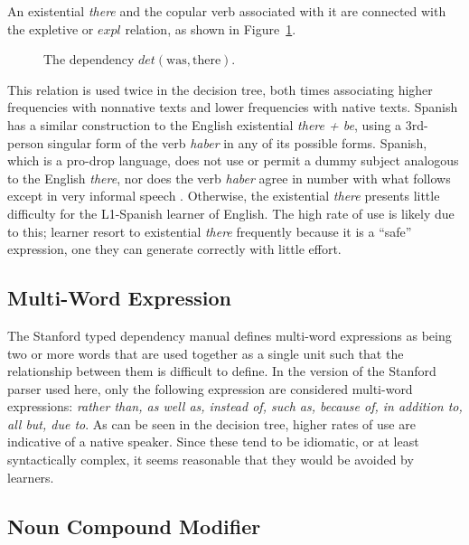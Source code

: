 \documentclass[main.tex]{subfiles}
\begin{document}
An existential \textit{there} and the copular verb associated with it are connected with the expletive or $expl$ relation, as shown in Figure~\ref{ex:expl}. 
\begin{figure}[ht]
\centering
{}
\caption{The dependency $det(\text{was},\text{there})$. \citep[Ch. 3.29]{quirk:1985}}
\label{ex:expl}
\end{figure}
This relation is used twice in the decision tree, both times associating higher frequencies with nonnative texts and lower frequencies with native texts. Spanish has a similar construction to the English existential \textit{there + be}, using a 3rd-person singular form of the verb \textit{haber} in any of its possible forms. Spanish, which is a pro-drop language, does not use or permit a dummy subject analogous to the English \textit{there}, nor does the verb \textit{haber} agree in number with what follows except in very informal speech \citep[Ch. 30]{butt}. Otherwise, the existential \textit{there} presents little difficulty for the L1-Spanish learner of English. The high rate of use is likely due to this; learner resort to existential \textit{there} frequently because it is a ``safe'' expression, one they can generate correctly with little effort.

\subsection{Multi-Word Expression}

The Stanford typed dependency manual \citep{typed-deps-manual} defines multi-word expressions as being two or more words that are used together as a single unit such that the relationship between them is difficult to define. In the version of the Stanford parser used here, only the following expression are considered multi-word expressions: \textit{rather than, as well as, instead of, such as, because of, in addition to, all but, due to}. As can be seen in the decision tree, higher rates of use are indicative of a native speaker. Since these tend to be idiomatic, or at least syntactically complex, it seems reasonable that they would be avoided by learners.

\subsection{Noun Compound Modifier}
\label{sub:nn}
\end{document}
